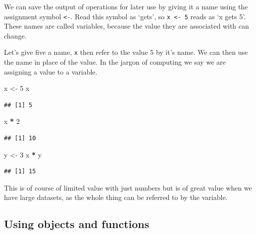 \documentclass[
]{book}
\newenvironment{Shaded}{\begin{snugshade}}{\end{snugshade}}
\newcommand{\DecValTok}[1]{\textcolor[rgb]{0.00,0.00,0.81}{#1}}
\newcommand{\NormalTok}[1]{#1}
\newcommand{\OperatorTok}[1]{\textcolor[rgb]{0.81,0.36,0.00}{\textbf{#1}}}
\newcommand{\StringTok}[1]{\textcolor[rgb]{0.31,0.60,0.02}{#1}}
\begin{document}
We can save the output of operations for later use by giving it a name using the assignment symbol \texttt{\textless{}-}. Read this symbol as `gets', so \texttt{x\ \textless{}-\ 5} reads as `x gets 5'. These names are called variables, because the value they are associated with can change.

Let's give five a name, \texttt{x} then refer to the value 5 by it's name. We can then use the name in place of the value. In the jargon of computing we say we are assigning a value to a variable.

\begin{Shaded}
\begin{Highlighting}[]
\NormalTok{ x <-}\StringTok{ }\DecValTok{5}
\NormalTok{ x}
\end{Highlighting}
\end{Shaded}

\begin{verbatim}
## [1] 5
\end{verbatim}

\begin{Shaded}
\begin{Highlighting}[]
\NormalTok{ x }\OperatorTok{*}\StringTok{ }\DecValTok{2}
\end{Highlighting}
\end{Shaded}

\begin{verbatim}
## [1] 10
\end{verbatim}

\begin{Shaded}
\begin{Highlighting}[]
\NormalTok{y <-}\StringTok{ }\DecValTok{3}
\NormalTok{x }\OperatorTok{*}\StringTok{ }\NormalTok{y}
\end{Highlighting}
\end{Shaded}

\begin{verbatim}
## [1] 15
\end{verbatim}

This is of course of limited value with just numbers but is of great value when we have large datasets, as the whole thing can be referred to by the variable.

\hypertarget{using-objects-and-functions}{%
\subsection{Using objects and functions}\label{using-objects-and-functions}}
\end{document}
